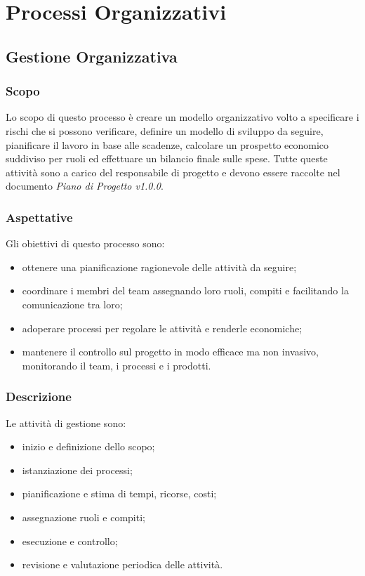 \section{Processi Organizzativi}
	\subsection{Gestione Organizzativa}
		\subsubsection{Scopo}
		Lo scopo di questo processo è creare un modello organizzativo volto a specificare i rischi che si possono verificare, definire un modello di sviluppo da seguire, pianificare il lavoro in base alle scadenze, calcolare un prospetto economico suddiviso per ruoli ed effettuare un bilancio finale sulle spese. Tutte queste attività sono a carico del responsabile di progetto e devono essere raccolte nel documento \textit{Piano di Progetto v1.0.0}.
		\subsubsection{Aspettative}
		Gli obiettivi di questo processo sono:
		\begin{itemize}
			\item ottenere una pianificazione ragionevole delle attività da seguire;
			\item coordinare i membri del team assegnando loro ruoli, compiti e facilitando la comunicazione tra loro;
			\item adoperare processi per regolare le attività e renderle economiche;
			\item mantenere il controllo sul progetto in modo efficace ma non invasivo, monitorando il team, i processi e i prodotti.
		\end{itemize}
		\subsubsection{Descrizione}
		Le attività di gestione sono:
		\begin{itemize}
			\item inizio e definizione dello scopo;
			\item istanziazione dei processi;
			\item pianificazione e stima di tempi, ricorse, costi;
			\item assegnazione ruoli e compiti;
			\item esecuzione e controllo;
			\item revisione e valutazione periodica delle attività.
		\end{itemize}
